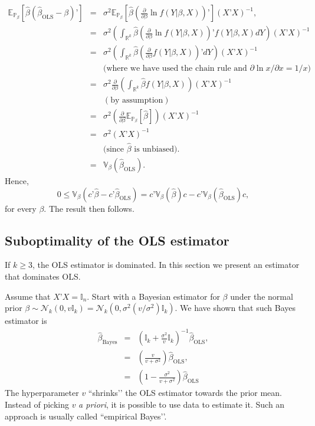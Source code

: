 \documentclass[11pt]{article} %
\begin{document}
\begin{eqnarray*}
\mathbb{E}_{\mathbb{P}_{\beta}} \left[  \widehat{\beta} (\widehat{\beta}_{\textrm{OLS}}-\beta)’  \right] &=& \sigma^2 \mathbb{E}_{\mathbb{P}_{\beta}} \left[  \widehat{\beta} \left( \frac{\partial}{\partial \beta} \ln f(Y | \beta, X )\right)’ \right]  (X’X)^{-1}, \\
&=& \sigma^2 \left( \int_{\mathbb{R}^{k}} \widehat{\beta}  \left( \frac{\partial}{\partial \beta} \ln f(Y | \beta, X )\right)’  f(Y | \beta , X) dY \right) (X’X)^{-1} \\
&=& \sigma^2 \left( \int_{\mathbb{R}^{k}} \widehat{\beta}  \left( \frac{\partial}{\partial \beta} f(Y | \beta, X )\right)’ dY \right) (X’X)^{-1}\\
&& \textrm{(where we have used the chain rule and $\partial \ln x/ \partial x = 1/x$)}\\ 
&=& \sigma^2 \frac{\partial }{\partial \beta }\left( \int_{\mathbb{R}^{k}} \widehat{\beta}   f(Y | \beta, X )\right)  (X’X)^{-1}\\
&& (\textrm{by assumption}) \\ 
&=& \sigma^2 \left( \frac{\partial }{\partial \beta } \mathbb{E}_{\mathbb{P}_{\beta}}[\widehat{\beta}]  \right) (X’X)^{-1}\\
&=& \sigma^2 (X’X)^{-1}\\
&& \textrm{(since $\widehat{\beta}$ is unbiased).} \\
&=& \mathbb{V}_{\beta}(\widehat{\beta}_{\textrm{OLS}}).
\end{eqnarray*}
Hence, 
\[ 0 \leq \mathbb{V}_{\beta} \left( c’\widehat{\beta} - c’ \widehat{\beta}_{\textrm{OLS}} \right) = c’ \mathbb{V}_{\beta}(\widehat{\beta}) c - c’ \mathbb{V}_{\beta}(\widehat{\beta}_{\textrm{OLS}}) c,  \]
for every $\beta$. The result then follows. 


\subsection{Suboptimality of the OLS estimator}

If $k \geq 3$, the OLS estimator is dominated. In this section we present an estimator that dominates OLS.

Assume that $X’X = \mathbb{I}_n$. Start with a Bayesian estimator for $\beta$ under the normal prior $\beta \sim \mathcal{N}_{k}(0,  v \mathbb{I}_k ) = \mathcal{N}_{k}(0,  \sigma^2 (v/\sigma^2) \mathbb{I}_k ) $. We have shown that such Bayes estimator is
\begin{eqnarray*}
\widehat{\beta}_{\textrm{Bayes}} &=& \left(  \mathbb{I}_k + \frac{\sigma^2}{v} \mathbb{I}_k  \right)^{-1} \widehat{\beta} _{\textrm{OLS}}, \\ 
&=& \left( \frac{v}{v+\sigma^2} \right) \widehat{\beta}_{\textrm{OLS}}, \\
&=& \left(1 -  \frac{\sigma^2}{v+\sigma^2} \right) \widehat{\beta}_{\textrm{OLS}}
\end{eqnarray*}
The hyperparameter $v$ ``shrinks’’ the OLS estimator towards the prior mean. Instead of picking $v$ \emph{a priori}, it is possible to use data to estimate it. Such an approach is usually called ``empirical Bayes’’. 
\end{document}
